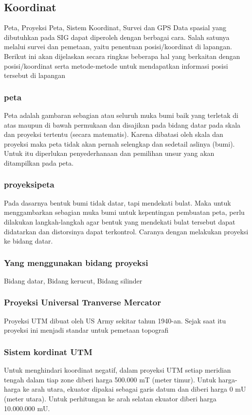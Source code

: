 \subsection{Koordinat}
Peta, Proyeksi Peta, Sistem Koordinat, Survei dan GPS 
   Data spasial yang dibutuhkan pada SIG dapat diperoleh dengan berbagai cara. Salah satunya melalui survei dan pemetaan, yaitu penentuan posisi/koordinat di lapangan. Berikut ini akan dijelaskan secara ringkas beberapa hal yang berkaitan dengan posisi/koordinat serta metode-metode untuk mendapatkan informasi posisi tersebut di lapangan
\subsubsection{peta}
Peta adalah gambaran sebagian atau seluruh muka bumi baik yang terletak di atas maupun di bawah permukaan dan disajikan pada bidang datar pada skala dan proyeksi tertentu (secara matematis). Karena dibatasi oleh skala dan proyeksi maka peta tidak akan pernah selengkap dan sedetail aslinya (bumi). Untuk itu diperlukan penyederhanaan dan pemilihan unsur yang akan ditampilkan pada peta.
\subsubsection{proyeksipeta}
Pada dasarnya bentuk bumi tidak datar, tapi mendekati bulat. Maka untuk menggambarkan sebagian muka bumi untuk kepentingan pembuatan peta, perlu dilakukan langkah-langkah agar bentuk yang mendekati bulat tersebut dapat didatarkan dan distorsinya dapat terkontrol. Caranya dengan melakukan proyeksi ke bidang datar.
\subsubsection{Yang menggunakan bidang proyeksi}
Bidang datar, Bidang kerucut, Bidang silinder
\subsubsection{Proyeksi Universal Tranverse Mercator}
Proyeksi UTM dibuat oleh US Army sekitar tahun 1940-an. Sejak saat itu proyeksi ini menjadi standar untuk pemetaan topografi
\subsubsection{Sistem kordinat UTM}
Untuk menghindari koordinat negatif, dalam proyeksi UTM setiap meridian tengah dalam tiap zone diberi harga 500.000 mT (meter timur). Untuk harga-harga ke arah utara, ekuator dipakai sebagai garis datum dan diberi harga 0 mU (meter utara). Untuk perhitungan ke arah selatan ekuator diberi harga 10.000.000 mU.

